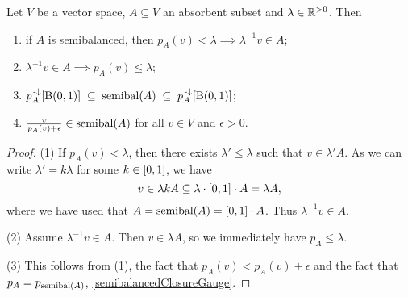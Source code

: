 \begin{lemma} \label{gaugeLemma}
Let $V$ be a vector space, $A\subseteq V$ an absorbent subset and $\lambda\in \mathbb{R}^{> 0}$. Then
\begin{enumerate}
\item if $A$ is semibalanced, then $p_A(v) < \lambda \implies \lambda^{-1}v\in A$;
\item $\lambda^{-1}v\in A \implies p_A(v) \leq \lambda$;
\item $p_A^{{\text{\hspace{0.15em}-}\downarrow}}[\operatorname{B}(0,1)] \;\subseteq\; \operatorname{semibal}(A) \;\subseteq\; p_A^{{\text{\hspace{0.15em}-}\downarrow}}[\operatorname{\overline{B}}(0,1)]$;
\item $\frac{v}{p_A(v)+\epsilon} \in \operatorname{semibal}(A)$ for all $v\in V$ and $\epsilon >0$.
\end{enumerate}
\end{lemma}
\begin{proof}
(1) If $p_A(v) < \lambda$, then there exists $\lambda' \leq \lambda$ such that $v\in \lambda' A$. As we can write $\lambda' = k\lambda$ for some $k\in\interval{0,1}$, we have
\[ v\in \lambda k A \subseteq \lambda \cdot \interval{0,1}\cdot A = \lambda A, \]
where we have used that $A = \semibalanced(A) = \interval{0,1}\cdot A$. Thus $\lambda^{-1}v \in A$.

(2) Assume $\lambda^{-1}v \in A$. Then $v\in \lambda A$, so we immediately have $p_A \leq \lambda$.

(3) This follows from (1), the fact that $p_A(v) < p_A(v) + \epsilon$ and the fact that $p_A = p_{\operatorname{semibal}(A)}$, \ref{semibalancedClosureGauge}.
\end{proof}

